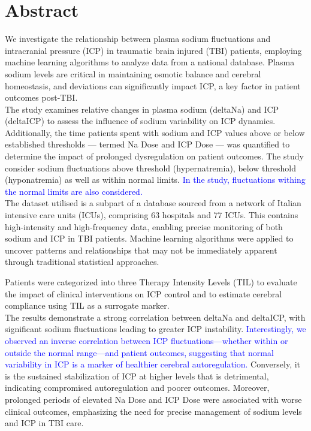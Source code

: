 \chapter*{Abstract}

We investigate the relationship between plasma sodium fluctuations and intracranial pressure (ICP) in traumatic brain injured (TBI) patients, employing machine learning algorithms to analyze data from a national database. Plasma sodium levels are critical in maintaining osmotic balance and cerebral homeostasis, and deviations can significantly impact ICP, a key factor in patient outcomes post-TBI.\\

The study examines relative changes in plasma sodium (deltaNa) and ICP (deltaICP) to assess the influence of sodium variability on ICP dynamics. Additionally, the time patients spent with sodium and ICP values above or below established thresholds — termed Na Dose and ICP Dose — was quantified to determine the impact of prolonged dysregulation on patient outcomes. The study consider sodium fluctuations above threshold (hypernatremia), below threshold (hyponatremia) as well as within normal limits. \textcolor{blue}{In the study, fluctuations withing the normal limits are also considered.} \\

The dataset utilised is a subpart of a database sourced from a network of Italian intensive care units (ICUs), comprising 63 hospitals and 77 ICUs. This contains high-intensity and high-frequency data, enabling precise monitoring of both sodium and ICP in TBI patients. Machine learning algorithms were applied to uncover patterns and relationships that may not be immediately apparent through traditional statistical approaches.

Patients were categorized into three Therapy Intensity Levels (TIL) to evaluate the impact of clinical interventions on ICP control and to estimate cerebral compliance using TIL as a surrogate marker. \\

The results demonstrate a strong correlation between deltaNa and deltaICP, with significant sodium fluctuations leading to greater ICP instability. \textcolor{blue}{Interestingly, we observed an inverse correlation between ICP fluctuations—whether within or outside the normal range—and patient outcomes, suggesting that normal variability in ICP is a marker of healthier cerebral autoregulation.} Conversely, it is the sustained stabilization of ICP at higher levels that is detrimental, indicating compromised autoregulation and poorer outcomes. Moreover, prolonged periods of elevated Na Dose and ICP Dose were associated with worse clinical outcomes, emphasizing the need for precise management of sodium levels and ICP in TBI care.